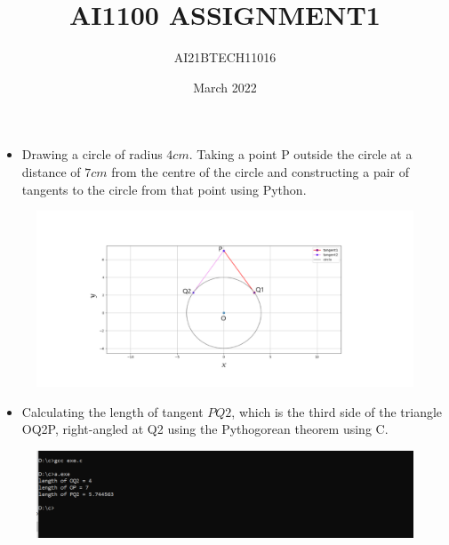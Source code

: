 \documentclass[12pt]{report}
\title{AI1100 ASSIGNMENT1}
\author{AI21BTECH11016}
\date{March 2022}
\begin{document}
\maketitle


\begin{itemize}

\item Drawing a circle of radius $4 cm$. Taking a point P outside the circle at a distance of $7 cm$ from the centre of the circle and constructing a pair of tangents to the circle from that point using Python. \\

\end{itemize}
	    
	
  \begin{figure}[h!]
	  \centering 
	  \includegraphics[width=\columnwidth]{imagePython}
	  \caption{}
	  \end{figure}
	  	  	  
\begin{itemize}

\item Calculating the length of tangent $PQ2$, which is the third side of the triangle OQ2P, right-angled at Q2 using the Pythogorean theorem using C. \\

\end{itemize} 
 
 \begin{figure}[h!]
	  \centering 
	  \includegraphics[width=\columnwidth]{imageC}
	  \caption{}
	  \end{figure}
\end{document}
